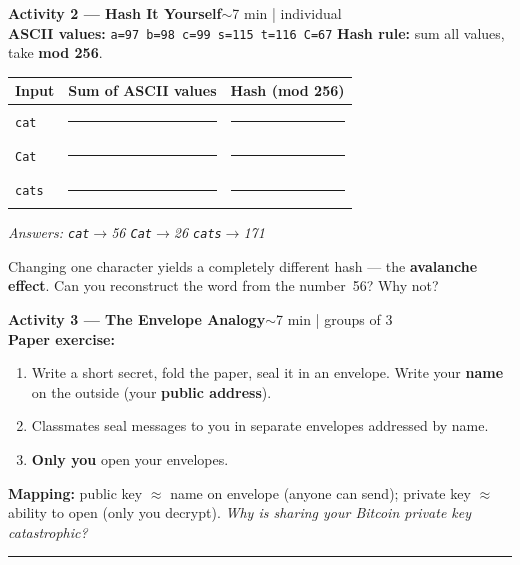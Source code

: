 \documentclass[11pt,a4paper]{article}
\newcommand{\activitybox}[3]{%
  \noindent\colorbox{mllavender4}{\parbox{\dimexpr\linewidth-2\fboxsep}{%
    \textbf{\color{mlpurple}#1}\hfill\textcolor{mlgray}{\small #2}\\[2pt]#3%
  }}\par\vspace{4pt}%
}
\newcommand{\fillcell}{\rule{2.2cm}{0.3pt}}
\begin{document}
\activitybox{Activity 2 --- Hash It Yourself}{$\sim$7 min | individual}{%
\textbf{ASCII values:} \texttt{a=97 \; b=98 \; c=99 \; s=115 \; t=116 \; C=67}
\quad\textbf{Hash rule:} sum all values, take \textbf{mod 256}.

\vspace{3pt}
\begin{center}
\renewcommand{\arraystretch}{1.35}
\begin{tabular}{|l|c|c|}
\hline
\textbf{Input} & \textbf{Sum of ASCII values} & \textbf{Hash (mod 256)} \\
\hline
\texttt{cat}  & \fillcell & \fillcell \\
\hline
\texttt{Cat}  & \fillcell & \fillcell \\
\hline
\texttt{cats} & \fillcell & \fillcell \\
\hline
\end{tabular}
\end{center}

\vspace{2pt}
\textit{Answers: \texttt{cat}$\to$56 \quad \texttt{Cat}$\to$26 \quad \texttt{cats}$\to$171}

\vspace{2pt}
Changing one character yields a completely different hash --- the \textbf{avalanche effect}.
Can you reconstruct the word from the number~56? Why not?
}

\vspace{2pt}

\activitybox{Activity 3 --- The Envelope Analogy}{$\sim$7 min | groups of 3}{%
\textbf{Paper exercise:}
\begin{enumerate}
  \item Write a short secret, fold the paper, seal it in an envelope. Write your \textbf{name} on
        the outside (your \textcolor{mlblue}{\textbf{public address}}).
  \item Classmates seal messages to you in separate envelopes addressed by name.
  \item \textbf{Only you} open your envelopes.
\end{enumerate}

\textbf{Mapping:} public key $\approx$ name on envelope (anyone can send); private key $\approx$
ability to open (only you decrypt). \textit{Why is sharing your Bitcoin private key catastrophic?}
\vspace{4pt}
\noindent\rule{\linewidth}{0.3pt}
}
\end{document}
